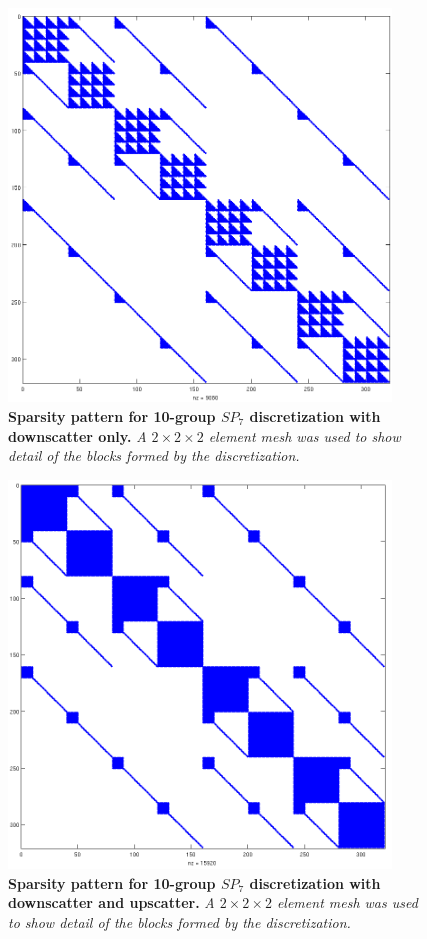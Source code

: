 \begin{figure}[t!]
  \begin{center}
    \includegraphics[width=4in]{chapters/spn_equations/group10ds.png}
  \end{center}
  \caption{\textbf{Sparsity pattern for 10-group $SP_7$ discretization
      with downscatter only.} \textit{A $2\times 2 \times 2$ element
      mesh was used to show detail of the blocks formed by the
      discretization.}}
  \label{fig:group10ds}
\end{figure}
\begin{figure}[t!]
  \begin{center}
    \includegraphics[width=4in]{chapters/spn_equations/group10us.png}
  \end{center}
  \caption{\textbf{Sparsity pattern for 10-group $SP_7$ discretization
      with downscatter and upscatter.} \textit{A $2\times 2 \times 2$ element
      mesh was used to show detail of the blocks formed by the
      discretization.}}
  \label{fig:group10us}
\end{figure}
